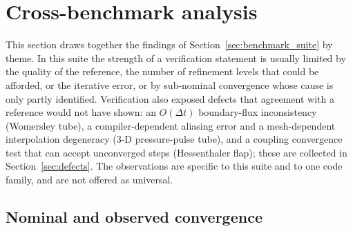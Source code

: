 \section{Cross-benchmark analysis}\label{sec:cross_benchmark}


This section draws together the findings of Section~\ref{sec:benchmark_suite} by theme.
In this suite the strength of a verification statement is usually limited by the quality of the reference, the number of refinement levels that could be afforded, or the iterative error, or by sub-nominal convergence whose cause is only partly identified.
Verification also exposed defects that agreement with a reference would not have shown: an $O(\Delta t)$ boundary-flux inconsistency (Womersley tube), a compiler-dependent aliasing error and a mesh-dependent interpolation degeneracy (3-D pressure-pulse tube), and a coupling convergence test that can accept unconverged steps (Hessenthaler flap); these are collected in Section~\ref{sec:defects}.
The observations are specific to this suite and to one code family, and are not offered as universal.

\subsection{Nominal and observed convergence}\label{sec:cross_convergence}

